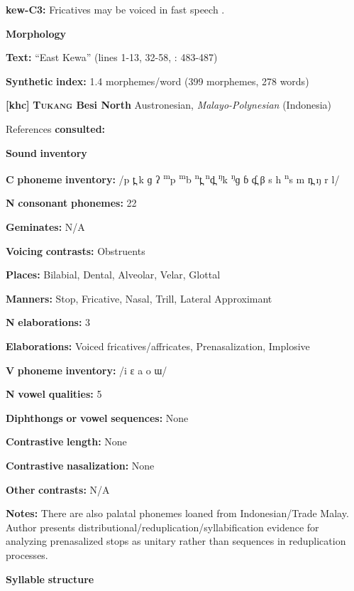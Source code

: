 \textbf{kew-C3:} Fricatives may be voiced in fast speech \citep[24]{Franklin1971}.

\textbf{Morphology}

\textbf{Text:} “East Kewa” (lines 1-13, 32-58, \citealt{FranklinFranklin1978}: 483-487)

\textbf{Synthetic} \textbf{index:} 1.4 morphemes/word (399 morphemes, 278 words)

\textbf{[khc]}   \textbf{\textsc{Tukang} \textbf{Besi} \textbf{North}}  Austronesian, \textit{Malayo-Polynesian} (Indonesia)

References \textbf{consulted:} \citet{Donohue1999}

\textbf{Sound} \textbf{inventory}

\textbf{C} \textbf{phoneme} \textbf{inventory:} /p t̪ k ɡ ʔ \textsuperscript{m}p \textsuperscript{m}b \textsuperscript{n}t̪ \textsuperscript{n}d̪ \textsuperscript{ŋ}k \textsuperscript{ŋ}ɡ ɓ ɗ̪ β s h \textsuperscript{n}s m n̪ ŋ r l/

\textbf{N} \textbf{consonant} \textbf{phonemes:} 22

\textbf{Geminates:} N/A

\textbf{Voicing} \textbf{contrasts:} Obstruents

\textbf{Places:} Bilabial, Dental, Alveolar, Velar, Glottal

\textbf{Manners:} Stop, Fricative, Nasal, Trill, Lateral Approximant

\textbf{N} \textbf{elaborations:} 3

\textbf{Elaborations:} Voiced fricatives/affricates, Prenasalization, Implosive

\textbf{V} \textbf{phoneme} \textbf{inventory:} /i ɛ a o ɯ/

\textbf{N} \textbf{vowel} \textbf{qualities:} 5

\textbf{Diphthongs} \textbf{or} \textbf{vowel} \textbf{sequences:} None

\textbf{Contrastive} \textbf{length:} None

\textbf{Contrastive} \textbf{nasalization:} None

\textbf{Other} \textbf{contrasts:} N/A

\textbf{Notes:} There are also palatal phonemes loaned from Indonesian/Trade Malay. Author presents distributional/reduplication/syllabification evidence for analyzing prenasalized stops as unitary rather than sequences in reduplication processes.

\textbf{Syllable} \textbf{structure}

